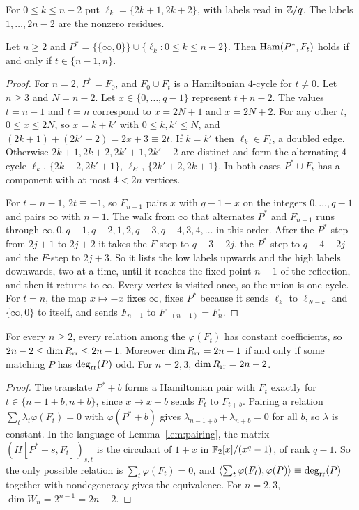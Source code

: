 For $0\le k\le n-2$ put $\ell_k=\{2k+1,2k+2\}$, with labels read in $\mathbb{Z}/q$. The labels $1,\dots,2n-2$ are the nonzero residues.

\begin{proposition}\label{prop:pstar}
Let $n\ge2$ and $P^*=\{\{\infty,0\}\}\cup\{\ell_k:0\le k\le n-2\}$. Then $\operatorname{Ham}(P^*,F_t)$ holds if and only if $t\in\{n-1,n\}$.
\end{proposition}

\begin{proof}
For $n=2$, $P^*=F_0$, and $F_0\cup F_t$ is a Hamiltonian $4$-cycle for $t\ne0$. Let $n\ge3$ and $N=n-2$. Let $x\in\{0,\dots,q-1\}$ represent $t+n-2$. The values $t=n-1$ and $t=n$ correspond to $x=2N+1$ and $x=2N+2$. For any other $t$, $0\le x\le2N$, so $x=k+k'$ with $0\le k,k'\le N$, and $(2k+1)+(2k'+2)=2x+3\equiv2t$. If $k=k'$ then $\ell_k\in F_t$, a doubled edge. Otherwise $2k+1,2k+2,2k'+1,2k'+2$ are distinct and form the alternating $4$-cycle $\ell_k$, $\{2k+2,2k'+1\}$, $\ell_{k'}$, $\{2k'+2,2k+1\}$. In both cases $P^*\cup F_t$ has a component with at most $4<2n$ vertices.

For $t=n-1$, $2t\equiv-1$, so $F_{n-1}$ pairs $x$ with $q-1-x$ on the integers $0,\dots,q-1$ and pairs $\infty$ with $n-1$. The walk from $\infty$ that alternates $P^*$ and $F_{n-1}$ runs through $\infty,0,q-1,q-2,1,2,q-3,q-4,3,4,\dots$ in this order. After the $P^*$-step from $2j+1$ to $2j+2$ it takes the $F$-step to $q-3-2j$, the $P^*$-step to $q-4-2j$ and the $F$-step to $2j+3$. So it lists the low labels upwards and the high labels downwards, two at a time, until it reaches the fixed point $n-1$ of the reflection, and then it returns to $\infty$. Every vertex is visited once, so the union is one cycle. For $t=n$, the map $x\mapsto-x$ fixes $\infty$, fixes $P^*$ because it sends $\ell_k$ to $\ell_{N-k}$ and $\{\infty,0\}$ to itself, and sends $F_{n-1}$ to $F_{-(n-1)}=F_n$.
\end{proof}

\begin{theorem}\label{thm:ladder}
For every $n\ge2$, every relation among the $\varphi(F_t)$ has constant coefficients, so $2n-2\le\dim R_{\mathrm{rr}}\le2n-1$. Moreover $\dim R_{\mathrm{rr}}=2n-1$ if and only if some matching $P$ has $\deg_{\mathrm{rr}}(P)$ odd. For $n=2,3$, $\dim R_{\mathrm{rr}}=2n-2$.
\end{theorem}

\begin{proof}
The translate $P^*+b$ forms a Hamiltonian pair with $F_t$ exactly for $t\in\{n-1+b,n+b\}$, since $x\mapsto x+b$ sends $F_t$ to $F_{t+b}$. Pairing a relation $\sum_t\lambda_t\varphi(F_t)=0$ with $\varphi(P^*+b)$ gives $\lambda_{n-1+b}+\lambda_{n+b}=0$ for all $b$, so $\lambda$ is constant. In the language of Lemma~\ref{lem:pairing}, the matrix ${(H[P^*+s,F_t])}_{s,t}$ is the circulant of $1+x$ in $\mathbb{F}_2[x]/(x^q-1)$, of rank $q-1$. So the only possible relation is $\sum_t\varphi(F_t)=0$, and $\langle\sum_t\varphi(F_t),\varphi(P)\rangle\equiv\deg_{\mathrm{rr}}(P)$ together with nondegeneracy gives the equivalence. For $n=2,3$, $\dim W_n=2^{n-1}=2n-2$.
\end{proof}


